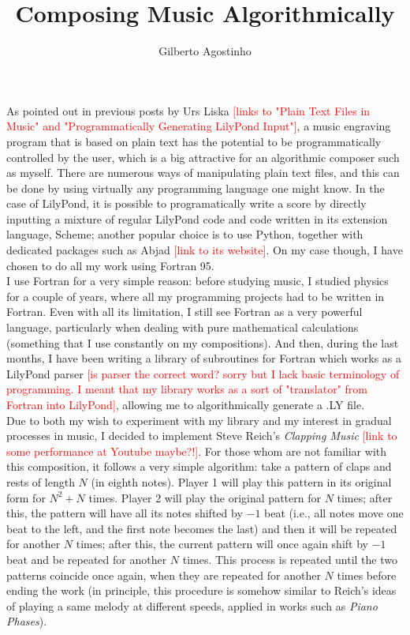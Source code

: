 \documentclass{article}
\begin{document}
\title{Composing Music Algorithmically}
\author{Gilberto Agostinho}
\date{}
\maketitle

As pointed out in previous posts by Urs Liska \textcolor{red}{[links to "Plain Text Files in Music" and "Programmatically Generating LilyPond Input"]}, a music engraving program that is based on plain text has the potential to be programmatically controlled by the user, which is a big attractive for an algorithmic composer such as myself. 
There are numerous ways of manipulating plain text files, and this can be done by using virtually any programming language one might know. 
In the case of LilyPond, it is possible to programatically write a score by directly inputting a mixture of regular LilyPond code and code written in its extension language, Scheme; another popular choice is to use Python, together with dedicated packages such as Abjad \textcolor{red}{[link to its website]}. 
On my case though, I have chosen to do all my work using Fortran 95. \\

I use Fortran for a very simple reason: before studying music, I studied physics for a couple of years, where all my programming projects had to be written in Fortran. 
Even with all its limitation, I still see Fortran as a very powerful language, particularly when dealing with pure mathematical calculations (something that I use constantly on my compositions). 
And then, during the last months, I have been writing a library of subroutines for Fortran which works as a LilyPond parser 
\textcolor{red}{[is parser the correct word? sorry but I lack basic terminology of programming. I meant that my library works as a sort of "translator" from Fortran into LilyPond]}, allowing me to algorithmically generate a .LY file. \\

Due to both my wish to experiment with my library and my interest in gradual processes in music, I decided to implement Steve Reich's \textit{Clapping Music} \textcolor{red}{[link to some performance at Youtube maybe?!]}. 
For those whom are not familiar with this composition, it follows a very simple algorithm: take a pattern of claps and rests of length $N$ (in eighth notes). 
Player 1 will play this pattern in its original form for $N^2+N$ times. 
Player 2 will play the original pattern for $N$ times; after this, the pattern will have all its notes shifted by $-1$ beat (i.e., all notes move one beat to the left, and the first note becomes the last) and then it will be repeated for another $N$ times; 
after this, the current pattern will once again shift by $-1$ beat and be repeated for another $N$ times. 
This process is repeated until the two patterns coincide once again, when they are repeated for another $N$ times before ending the work (in principle, this procedure is somehow similar to Reich's ideas of playing a same melody at different speeds, applied in works such as \textit{Piano Phases}). \\
\end{document}
